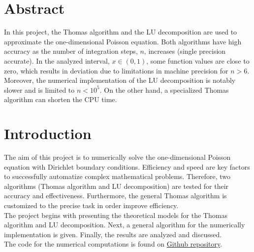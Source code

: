 \documentclass[%
oneside,                 %
final,                   %
10pt]{article}
\begin{document}





\newcommand{\exercisesection}[1]{\subsection*{#1}}






\thispagestyle{empty}


\section*{Abstract}
In this project, the Thomas algorithm and the LU decomposition are used to approximate the one-dimensional Poisson equation.
Both algorithms have high accuracy as the number of integration steps, $n$, increases (single precision accurate).
In the analyzed interval, $x\in(0,1)$, some function values are close to zero, which results in deviation due to limitations in machine precision for $n>6$.
Moreover, the numerical implementation of the LU decomposition is notably slower and is limited to $n<10^5$.
On the other hand, a specialized Thomas algorithm can shorten the CPU time.

\section*{Introduction}
The aim of this project is to numerically solve the one-dimensional Poisson equation with Dirichlet boundary conditions. 
Efficiency and speed are key factors to successfully automatize complex mathematical problems. 
Therefore, two algorithms (Thomas algorithm and LU decomposition) are tested for their accuracy and effectiveness. 
Furthermore, the general Thomas algorithm is customized to the precise task in order improve efficiency. \\
The project begins with presenting the theoretical models for the Thomas algorithm and LU decomposition. 
Next, a general algorithm for the numerically implementation is given.
Finally, the results are analyzed and discussed. \\
The code for the numerical computations is found on
\href{https://github.com/EliasTRuud/FYS3150/tree/master/Project1}{Github repository}.
\end{document}
